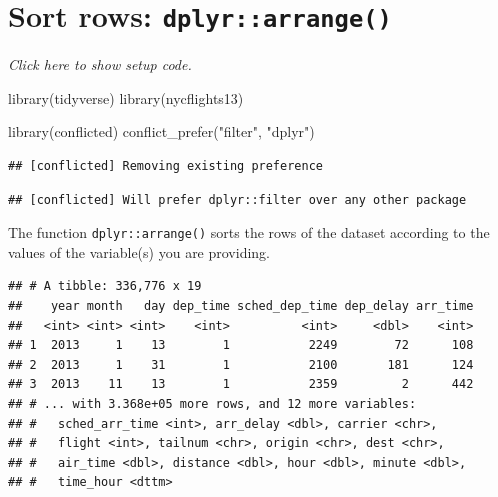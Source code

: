 \documentclass[]{book}
\newenvironment{Shaded}{}{}
\newcommand{\KeywordTok}[1]{\textcolor[rgb]{0.00,0.00,1.00}{#1}}
\newcommand{\NormalTok}[1]{#1}
\newcommand{\OperatorTok}[1]{#1}
\newcommand{\StringTok}[1]{\textcolor[rgb]{0.00,0.50,0.50}{#1}}
\begin{document}
\hypertarget{sort-rows-dplyrarrange}{%
\section{\texorpdfstring{Sort rows: \texttt{dplyr::arrange()}}{Sort rows: dplyr::arrange()}}\label{sort-rows-dplyrarrange}}

\emph{Click here to show setup code.}

\begin{Shaded}
\begin{Highlighting}[]
\KeywordTok{library}\NormalTok{(tidyverse)}
\KeywordTok{library}\NormalTok{(nycflights13)}

\KeywordTok{library}\NormalTok{(conflicted)}
\KeywordTok{conflict_prefer}\NormalTok{(}\StringTok{"filter"}\NormalTok{, }\StringTok{"dplyr"}\NormalTok{)}
\end{Highlighting}
\end{Shaded}

\begin{verbatim}
## [conflicted] Removing existing preference
\end{verbatim}

\begin{verbatim}
## [conflicted] Will prefer dplyr::filter over any other package
\end{verbatim}

The function \texttt{dplyr::arrange()} sorts the rows of the dataset according to the values of the variable(s) you are providing.

\begin{Shaded}
\end{Shaded}

\begin{verbatim}
## # A tibble: 336,776 x 19
##    year month   day dep_time sched_dep_time dep_delay arr_time
##   <int> <int> <int>    <int>          <int>     <dbl>    <int>
## 1  2013     1    13        1           2249        72      108
## 2  2013     1    31        1           2100       181      124
## 3  2013    11    13        1           2359         2      442
## # ... with 3.368e+05 more rows, and 12 more variables:
## #   sched_arr_time <int>, arr_delay <dbl>, carrier <chr>,
## #   flight <int>, tailnum <chr>, origin <chr>, dest <chr>,
## #   air_time <dbl>, distance <dbl>, hour <dbl>, minute <dbl>,
## #   time_hour <dttm>
\end{verbatim}
\end{document}

